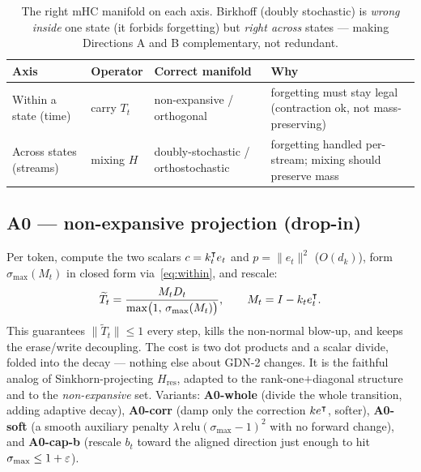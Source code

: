 \documentclass[11pt,letterpaper,logo]{yalearxiv}
\newcommand{\smax}{\sigma_{\max}}
\newcommand{\Tcarry}{T}                        %
\newcommand{\Hres}{H_{\mathrm{res}}}
\begin{document}
\begin{table}[t]
\centering
\small
\begin{tabular}{@{}llll@{}}
\toprule
Axis & Operator & Correct manifold & Why \\
\midrule
Within a state (time) & carry $\Tcarry_t$ & non-expansive / orthogonal &
forgetting must stay legal (contraction ok, not mass-preserving) \\
Across states (streams) & mixing $H$ & doubly-stochastic / orthostochastic &
forgetting handled per-stream; mixing should preserve mass \\
\bottomrule
\end{tabular}
\caption{The right mHC manifold on each axis. Birkhoff (doubly stochastic) is
\emph{wrong inside} one state (it forbids forgetting) but \emph{right across} states ---
making Directions A and B complementary, not redundant.}
\label{tab:manifolds}
\end{table}

\subsection{A0 --- non-expansive projection (drop-in)}
Per token, compute the two scalars $c = k_t^{\intercal} e_t$ and $p = \|e_t\|^2$ ($O(d_k)$),
form $\smax(M_t)$ in closed form via~\eqref{eq:within}, and rescale:
\begin{equation}
  \widetilde{\Tcarry}_t = \frac{M_t D_t}{\max\!\big(1,\, \smax(M_t)\big)},
  \qquad M_t = I - k_t e_t^{\tr}.
  \label{eq:a0}
\end{equation}
This guarantees $\|\widetilde{\Tcarry}_t\| \le 1$ every step, kills the non-normal
blow-up, and keeps the erase/write decoupling. The cost is two dot products and a scalar
divide, folded into the decay --- nothing else about GDN-2 changes. It is the faithful
analog of Sinkhorn-projecting $\Hres$, adapted to the rank-one$+$diagonal structure and to
the \emph{non-expansive} set. Variants: \textbf{A0-whole} (divide the whole transition,
adding adaptive decay), \textbf{A0-corr} (damp only the correction $k e^{\intercal}$, softer),
\textbf{A0-soft} (a smooth auxiliary penalty $\lambda\,\mathrm{relu}(\smax-1)^2$ with no
forward change), and \textbf{A0-cap-b} (rescale $b_t$ toward the aligned direction just
enough to hit $\smax \le 1+\eps$).
\end{document}
